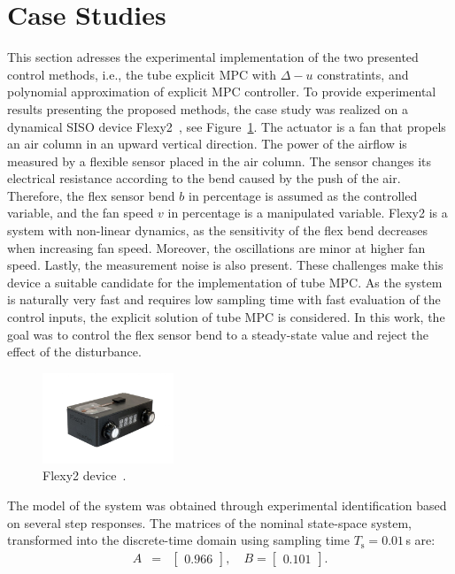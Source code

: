 \documentclass[letterpaper, 10 pt, conference]{ieeeconf}
\begin{document}
\section{Case Studies}
\label{sec:case_study}
This section adresses the experimental implementation of the two presented control methods, i.e., the tube explicit MPC with $\Delta-u$ constratints, and polynomial approximation of explicit MPC controller. To provide experimental results presenting the proposed methods, the case study was realized on a dynamical SISO device Flexy2~\cite{flexy2}, see Figure~\ref{fig:flexy2}. The actuator is a fan that propels an air column in an upward vertical direction. The power of the airflow is measured
by a flexible sensor placed in the air column. The sensor changes its electrical resistance according to the bend caused by the push of the air. Therefore, the flex sensor bend $b$ in percentage is assumed as the controlled variable, and the fan speed $v$ in percentage is a manipulated variable. Flexy2 is a system with non-linear dynamics, as the sensitivity of the flex bend decreases when increasing fan speed. Moreover, the oscillations are minor at higher fan speed. Lastly, the measurement noise is also present. These challenges make this device a suitable candidate for the implementation of tube MPC. As the system is naturally very fast and requires low sampling time with fast evaluation of the control inputs, the explicit solution of tube MPC is considered. In this work, the goal was to control the flex sensor bend to a steady-state value and reject the effect of the disturbance.

\begin{figure}
	\begin{center}
		\includegraphics[width=0.35\textwidth]{images/flexy2}
		\caption{Flexy2 device~\cite{flexy2}.}
		\label{fig:flexy2}
	\end{center}
\end{figure}

The model of the system was obtained through experimental identification based on several step responses. The matrices of the nominal state-space system, transformed into the discrete-time domain using sampling time $T_\mathrm{s} = 0.01$\,s are:
\begin{subequations}
	\label{eq:model_A_B} 
	\begin{eqnarray}
		A &=& \begin{bmatrix}
			0.966
		\end{bmatrix}, \quad %
		B = \begin{bmatrix}
			0.101
		\end{bmatrix}. 
	\end{eqnarray}
\end{subequations}
\end{document}
